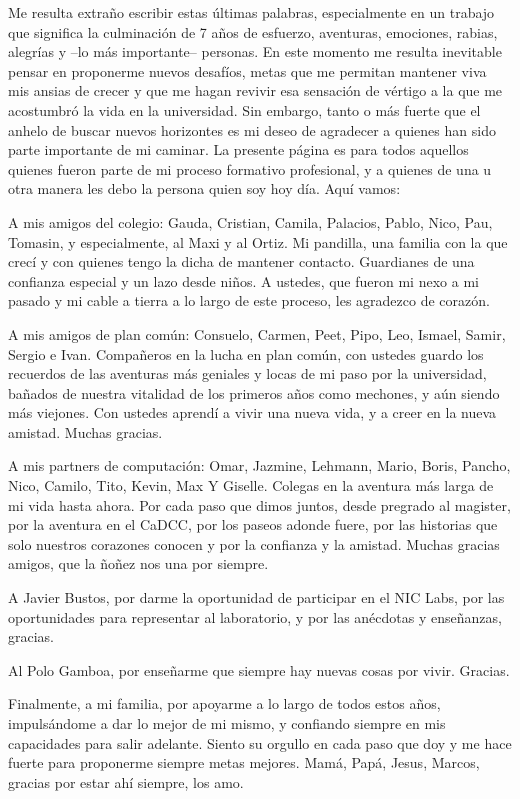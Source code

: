 \begin{thanks} %

Me resulta extraño escribir estas últimas palabras, especialmente en un trabajo que significa la culminación de 7 años de esfuerzo, aventuras, emociones, rabias, alegrías y --lo más importante-- personas. En este momento me resulta inevitable pensar en proponerme nuevos desafíos, metas que me permitan mantener viva mis ansias de crecer y que me hagan revivir esa sensación de vértigo a la que me acostumbró la vida en la universidad. Sin embargo, tanto o más fuerte que el anhelo de buscar nuevos horizontes es mi deseo de agradecer a quienes han sido parte importante de mi caminar. La presente página es para todos aquellos quienes fueron parte de mi proceso formativo profesional, y a quienes de una u otra manera les debo la persona quien soy hoy día. Aquí vamos: 
 
A mis amigos del colegio: Gauda, Cristian, Camila, Palacios, Pablo, Nico, Pau, Tomasin, y especialmente, al Maxi y al Ortiz. Mi pandilla, una familia con la que crecí y con quienes tengo la dicha de mantener contacto. Guardianes de una confianza especial y un lazo desde niños. A ustedes, que fueron mi nexo a mi pasado y mi cable a tierra a lo largo de este proceso, les agradezco de corazón. 
 
A mis amigos de plan común: Consuelo, Carmen, Peet, Pipo, Leo, Ismael, Samir, Sergio e Ivan. Compañeros en la lucha en plan común, con ustedes guardo los recuerdos de las aventuras más geniales y locas de mi paso por la universidad, bañados de nuestra vitalidad de los primeros años como mechones, y aún siendo más viejones. Con ustedes aprendí a vivir una nueva vida, y a creer en la nueva amistad. Muchas gracias. 
 
A mis partners de computación: Omar, Jazmine, Lehmann, Mario, Boris, Pancho, Nico, Camilo, Tito, Kevin, Max Y Giselle. Colegas en la aventura más larga de mi vida hasta ahora. Por cada paso que dimos juntos, desde pregrado al magister, por la aventura en el CaDCC, por los paseos adonde fuere, por las historias que solo nuestros corazones conocen y por la confianza y la amistad. Muchas gracias amigos, que la ñoñez nos una por siempre.  
 
A Javier Bustos, por darme la oportunidad de participar en el NIC Labs, por las oportunidades para representar al laboratorio, y por las anécdotas y enseñanzas, gracias.
 
Al Polo Gamboa, por enseñarme que siempre hay nuevas cosas por vivir. Gracias. 
 
Finalmente, a mi familia, por apoyarme a lo largo de todos estos años, impulsándome a dar lo mejor de mi mismo, y confiando siempre en mis capacidades para salir adelante. Siento su orgullo en cada paso que doy y me hace fuerte para proponerme siempre metas mejores. Mamá, Papá, Jesus, Marcos, gracias por estar ahí siempre, los amo.



\end{thanks}
